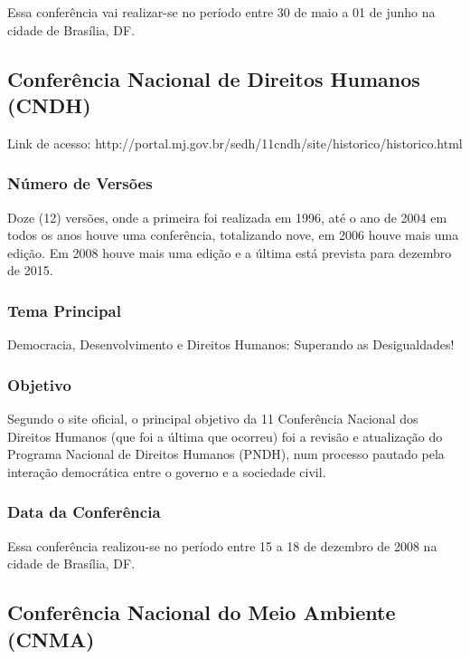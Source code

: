 Essa conferência vai realizar-se no período entre 30 de maio a 01 de
junho na cidade de Brasília, DF.
\newpage
\subsection*{Conferência Nacional de Direitos Humanos (CNDH)}

Link de acesso:
http://portal.mj.gov.br/sedh/11cndh/site/historico/historico.html

\subsubsection*{Número de Versões}


Doze (12) versões, onde a primeira foi realizada em 1996, até o ano
de 2004 em todos os anos houve uma conferência, totalizando nove, em
2006 houve mais uma edição. Em 2008 houve mais uma edição e
a última está prevista para dezembro de 2015.

\subsubsection*{Tema Principal}

Democracia, Desenvolvimento e Direitos Humanos:
Superando as Desigualdades!

\subsubsection*{Objetivo}

Segundo o site oficial, o principal objetivo da 11{\textordfeminine}
Conferência Nacional dos Direitos Humanos (que foi a última que
ocorreu) foi a revisão e atualização do Programa Nacional de
Direitos Humanos (PNDH), num processo pautado pela interação
democrática entre o governo e a sociedade civil.

\subsubsection*{Data da Conferência}

Essa conferência realizou-se no período entre 15 a 18 de dezembro de
2008 na cidade de Brasília, DF.

\newpage
\subsection*{Conferência Nacional do Meio Ambiente (CNMA)}

